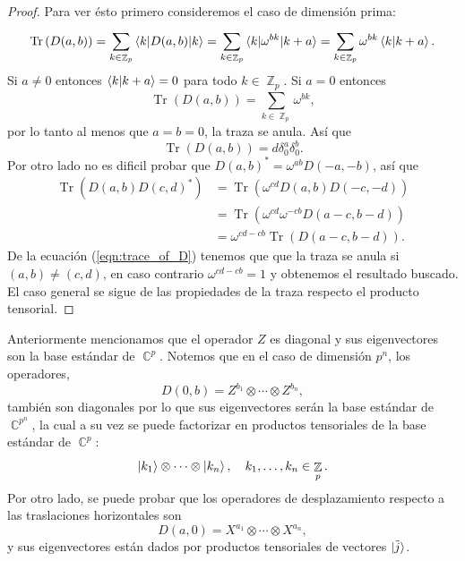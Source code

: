 \documentclass[a4paper,11pt]{report}
\DeclareMathOperator{\C}{\mathbb{C}}
\DeclareMathOperator{\Z}{\mathbb{Z}}
\DeclareMathOperator{\Tr}{Tr}
\begin{document}
  \begin{proof}
    Para ver ésto primero consideremos el caso de dimensión
    prima: 
    \begin{equation}
      \Tr\left( D(a,b) \right) 
      = \sum_{k \in \Z_p}^{} \braket{k|D(a,b)|k} 
      = \sum_{k \in \Z_p}^{} \braket{k|\omega^{bk}|k+a} 
      = \sum_{k \in \Z_p}^{} \omega^{bk} \braket{k|k+a}.
    \end{equation}
    Si $a \neq 0$ entonces $\braket{k|k+a} = 0$ para todo $k
    \in \Z_p$. Si $a = 0$ entonces 
    \[
      \Tr\left( D(a,b) \right) 
      = \sum_{k \in \Z_p}^{} \omega^{bk},
    \] 
    por lo tanto al menos que $a = b = 0$, la traza se
    anula.  Así que
    \begin{equation}
      \label{eqn:trace_of_D}
      \Tr\left( D(a,b) \right) 
      = d \delta^a_0 \delta^b_0.
    \end{equation} 
    Por otro lado no es dificil probar que $D(a,b)^{*} =
    \omega^{ab} D(-a,-b)$, así que 
    \begin{align}
      \Tr\left( D(a,b)D(c,d)^{*} \right) 
      &= \Tr\left( \omega^{cd} D(a,b) D(-c,-d) \right) \\
      &= \Tr\left( \omega^{cd} \omega^{-c b} D(a-c, b-d)
      \right) \\
      &= \omega^{cd-c b} \Tr(D(a-c,b-d)).
    \end{align} 
    De la ecuación (\ref{eqn:trace_of_D}) tenemos que que la
    traza se anula si $(a,b) \neq (c,d)$, en caso contrario
    $\omega^{cd-c b} = 1$ y obtenemos el resultado buscado.
    El caso general se sigue de las propiedades de la traza
    respecto el producto tensorial.
  \end{proof}

  Anteriormente mencionamos que el operador $Z$ es diagonal
  y sus eigenvectores son la base estándar de $\C^{p}$.
  Notemos que en el caso de dimensión $p^{n}$, los
  operadores, 
  \[
    D(0,b) = Z^{b_1} \otimes \cdots \otimes Z^{b_n},
  \] 
  también son diagonales por lo que sus eigenvectores serán
  la base estándar de $\C^{p^{n}}$, la cual a su vez se
  puede factorizar en productos tensoriales de la base
  estándar de $\C^{p}$:
  \[
    \ket{k_1} \otimes \cdots \otimes \ket{k_n},
    \quad k_1,\ldots,k_n \in \Z_p.
  \] 
  Por otro lado, se puede probar que los operadores de
  desplazamiento respecto a las traslaciones horizontales
  son
  \[
    D(a,0) = X^{a_1} \otimes \cdots \otimes X^{a_n},
  \] 
  y sus eigenvectores están dados por productos tensoriales
  de vectores $\ket{\tilde j}$.
\end{document}
